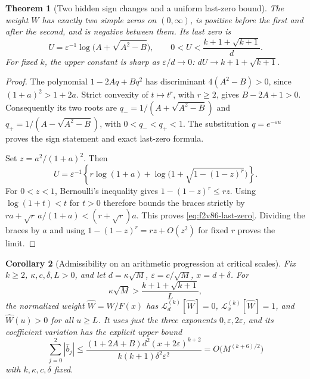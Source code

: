 \documentclass[11pt]{article}
\newtheorem{theorem}{Theorem}[section]
\newtheorem{corollary}[theorem]{Corollary}
\theoremstyle{definition}
\theoremstyle{remark}
\begin{document}
\begin{theorem}[Two hidden sign changes and a uniform last-zero bound]
\label{thm:f2v86-last-zero}
The weight \(W\) has exactly two simple zeros on \((0,\infty)\), is
positive before the first and after the second, and is negative between
them.  Its last zero is
\begin{equation}
 U=\varepsilon^{-1}\log\bigl(A+\sqrt{A^2-B}\bigr),\qquad
 0<U<\frac{k+1+\sqrt{k+1}}{d}.
 \label{eq:f2v86-last-zero}
\end{equation}
For fixed \(k\), the upper constant is sharp as
\(\varepsilon/d\to0\): \(dU\to k+1+\sqrt{k+1}\).
\end{theorem}

\begin{proof}
The polynomial \(1-2Aq+Bq^2\) has discriminant
\(4(A^2-B)>0\), since \((1+a)^2>1+2a\).  Strict convexity of
\(t\mapsto t^r\), with \(r\ge2\), gives \(B-2A+1>0\).
Consequently its two roots are
\(q_-=1/(A+\sqrt{A^2-B})\) and
\(q_+=1/(A-\sqrt{A^2-B})\), with
\(0<q_-<q_+<1\).  The substitution \(q=e^{-\varepsilon u}\)
proves the sign statement and exact last-zero formula.

Set \(z=a^2/(1+a)^2\).  Then
\[
 U=\varepsilon^{-1}\left\{
 r\log(1+a)+\log\bigl(1+\sqrt{1-(1-z)^r}\bigr)\right\}.
\]
For \(0<z<1\), Bernoulli's inequality gives
\(1-(1-z)^r\le rz\).  Using \(\log(1+t)<t\) for \(t>0\)
therefore bounds the braces strictly by
\(ra+\sqrt r\,a/(1+a)<(r+\sqrt r)a\).
This proves \eqref{eq:f2v86-last-zero}.  Dividing the braces by \(a\)
and using \(1-(1-z)^r=rz+O(z^2)\) for fixed \(r\) proves the limit.
\end{proof}

\begin{corollary}[Admissibility on an arithmetic progression at critical scales]
\label{cor:f2v86-critical}
Fix \(k\ge2\), \(\kappa,c,\delta,L>0\), and let
\(d=\kappa\sqrt M\), \(\varepsilon=c/\sqrt M\), \(x=d+\delta\).
For
\begin{equation}
 \kappa\sqrt M>\frac{k+1+\sqrt{k+1}}{L},
 \label{eq:f2v86-cutoff}
\end{equation}
the normalized weight \(\widehat W=W/F(x)\) has
\(\mathcal L_d^{(k)}[\widehat W]=0\),
\(\mathcal L_x^{(k)}[\widehat W]=1\), and
\(\widehat W(u)>0\) for all \(u\ge L\).  It uses just the
three exponents \(0,\varepsilon,2\varepsilon\), and its coefficient
variation has the explicit upper bound
\begin{equation}
 \sum_{j=0}^{2}|\widehat b_j|
 \le \frac{(1+2A+B)d^2(x+2\varepsilon)^{k+2}}
              {k(k+1)\delta^2\varepsilon^2}
 =O\bigl(M^{(k+6)/2}\bigr)
 \label{eq:f2v86-cost}
\end{equation}
with \(k,\kappa,c,\delta\) fixed.
\end{corollary}
\end{document}
